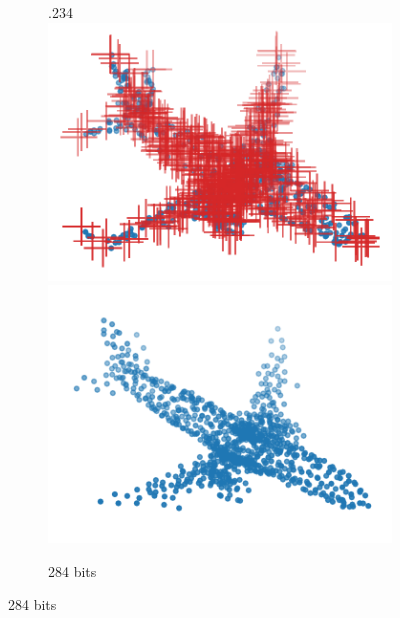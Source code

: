 \begin{figure}[t]
  \centering
  \newcommand{\subfigureouterhspace}{\linewidth}
  \newcommand{\subfigurehspace}{.234\linewidth}
  \begin{subfigure}[b]{\subfigureouterhspace}
    \setcounter{subsubfigure}{0}
    \centering
    \begin{subsubfigure}[b]{\subfigurehspace}
      \centering
      \includegraphics[width=\linewidth]{img/point_cloud_compression/crit/test_airplane_0630/full_4.pdf}
      \includegraphics[width=\linewidth]{img/point_cloud_compression/rec/test_airplane_0630/full_4.pdf}
      \caption{284 bits}
      \label{fig:rec/full/4}
    \end{subsubfigure}%
    \hfill%

\end{subfigure}
\end{figure}
